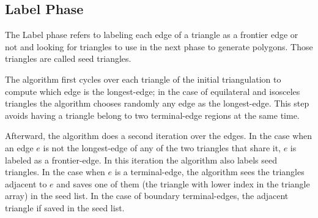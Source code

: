 \documentclass[pdflatex,sn-mathphys]{sn-jnl}%
\theoremstyle{thmstyleone}%
\theoremstyle{thmstyletwo}%
\theoremstyle{thmstylethree}%
\begin{document}
\subsection{Label Phase}
\label{subsec:Labelpohase}

The Label phase refers to labeling each edge of a triangle as a frontier edge or not and looking for triangles to use in the next phase to generate polygons. Those triangles are called seed triangles.

The algorithm first cycles over each triangle of the initial triangulation to compute which edge is the longest-edge; in the case of equilateral and isosceles triangles the algorithm chooses randomly any edge as the longest-edge. This step avoids having a triangle belong to two terminal-edge regions at the same time. 

Afterward, the algorithm does a second iteration over the edges. In the case when an edge $e$ is not the longest-edge of any of the two triangles that share it, $e$ is labeled as a frontier-edge. In this iteration the algorithm also labels seed triangles. In the case when $e$ is a terminal-edge, the algorithm sees the triangles adjacent to $e$ and saves one of them (the triangle with lower index in the triangle array) in the seed list. In the case of boundary terminal-edges, the adjacent triangle if saved in the seed list. 


\end{document}
